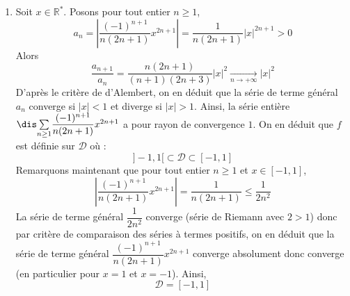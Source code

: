 \documentclass[a4paper,10pt]{report}
\newcommand{\Sum}[2]{\ensuremath{\textstyle{\sum\limits_{#1}^{#2}}}}
\begin{document}
\begin{enumerate}
\item Soit $x \in \mathbb{R}^*$. Posons pour tout entier $n \geq 1$,
$$ a_n = \left\vert \dfrac{(-1)^{n+1}}{n(2n+1)} x^{2n+1} \right\vert = \dfrac{1}{n(2n+1)} \vert x \vert ^{2n+1} >0$$
Alors 
$$ \dfrac{a_{n+1}}{a_n} = \dfrac{n(2n+1)}{(n+1)(2n+3)} \vert x \vert^2 \underset{n \rightarrow + \infty}{\longrightarrow} \vert x \vert^2$$
D'après le critère de d'Alembert, on en déduit que la série de terme général $a_n$ converge si $\vert x \vert<1$ et diverge si $\vert x \vert >1$. Ainsi, la série entière $\dis \Sum{n \geq 1}{} \dfrac{(-1)^{n+1}}{n(2n+1)} x^{2n+1}$ a pour rayon de convergence $1$. On en déduit que $f$ est définie sur $\mathcal{D}$ où :
$$ ]-1,1[ \subset \mathcal{D} \subset [-1,1]$$
Remarquons maintenant que pour tout entier $n \geq 1$ et $x \in [-1,1]$,
$$ \left\vert \dfrac{(-1)^{n+1}}{n(2n+1)} x^{2n+1} \right\vert= \dfrac{1}{n(2n+1)} \leq \dfrac{1}{2n^2}$$
La série de terme général $\dfrac{1}{2n^2}$ converge (série de Riemann avec $2>1$) donc par critère de comparaison des séries à termes positifs, on en déduit que la série de terme général $\dfrac{(-1)^{n+1}}{n(2n+1)} x^{2n+1}$ converge absolument donc converge (en particulier pour $x=1$ et $x=-1$). Ainsi,
$$ \mathcal{D}= [-1,1]$$


\end{enumerate}
\end{document}
